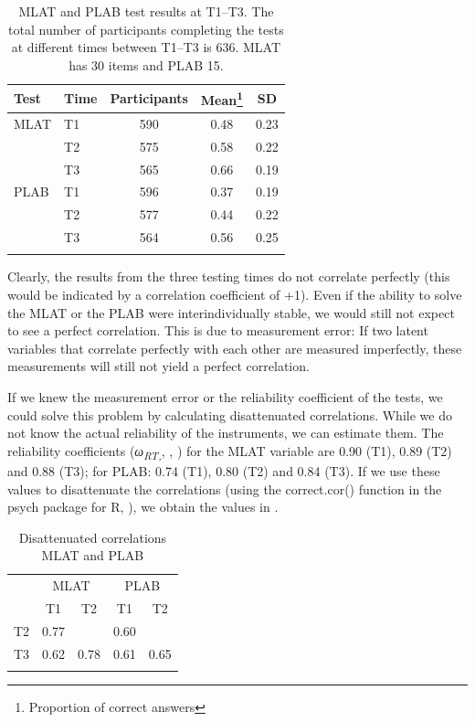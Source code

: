 \documentclass[output=paper]{langsci/langscibook}
\begin{document}
\begin{table}
\caption{\label{tab:10:1}MLAT and PLAB test results at T1--T3. The total number of participants completing the tests at different times between T1--T3 is 636. MLAT has 30 items and PLAB 15.}
\begin{tabular}{ll ccc}
\lsptoprule
{Test} & {Time} & {Participants} & {Mean\footnote{Proportion of correct answers}} & {SD}\\\midrule
{MLAT} & {T1} & {590} & {0.48} & {0.23}\\
       & {T2} & {575} & {0.58} & {0.22}\\
       & {T3} & {565} & {0.66} & {0.19}\\
{PLAB} & {T1} & {596} & {0.37} & {0.19}\\
       & {T2} & {577} & {0.44} & {0.22}\\
       & {T3} & {564} & {0.56} & {0.25}\\
\lspbottomrule
\end{tabular}
\end{table}

Clearly, the results from the three testing times do not correlate perfectly (this would be indicated by a correlation coefficient of +1). Even if the ability to solve the MLAT or the PLAB were interindividually stable, we would still not expect to see a perfect correlation. This is due to measurement error: If two latent variables that correlate perfectly with each other are measured imperfectly, these measurements will still not yield a perfect correlation. 

If we knew the measurement error or the reliability coefficient of the tests, we could solve this problem by calculating disattenuated correlations. While we do not know the actual reliability of the instruments, we can estimate them. The reliability coefficients (\textit{ω\textsubscript{RT,}}, \citealt{McNeish2018}, \citealt{Revelle2019}) for the MLAT variable are 0.90 (T1), 0.89 (T2) and 0.88 (T3); for PLAB: 0.74 (T1), 0.80 (T2) and 0.84 (T3). If we use these values to disattenuate the correlations (using the correct.cor() function in the psych package for R, \citealt{Revelle2018}), we obtain the values in .

\begin{table}
\caption{\label{tab:10:2}\label{tab:10:3}Disattenuated correlations MLAT and PLAB}
\begin{tabular}{lcc cc}
\lsptoprule
     & \multicolumn{2}{c}{MLAT} & \multicolumn{2}{c}{PLAB}\\\cmidrule(lr){2-3}\cmidrule(lr){4-5}
     & {T1} & {T2}     & {T1} & {T2}\\\midrule
{T2} & {0.77} &        & {0.60} & \\
{T3} & {0.62} & {0.78} & {0.61} & {0.65}\\
\lspbottomrule
\end{tabular}
\end{table}
\end{document}
